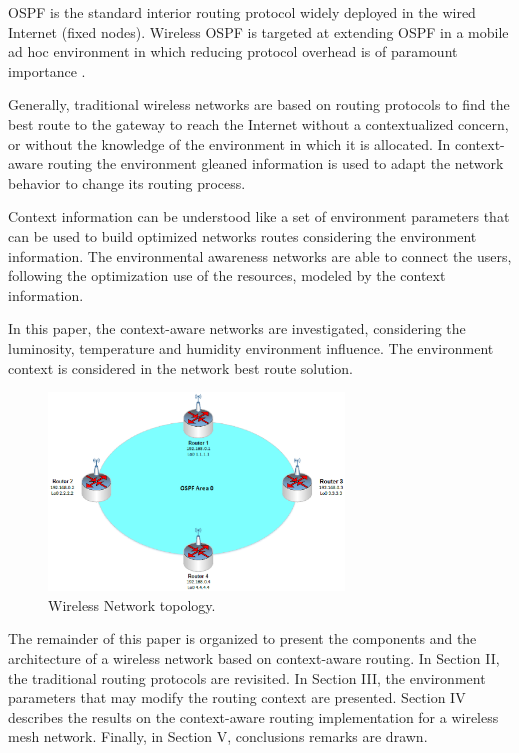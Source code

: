 OSPF is the standard interior routing protocol widely deployed in the wired Internet (fixed nodes). Wireless OSPF is targeted at extending OSPF in a mobile ad hoc environment in which reducing protocol overhead is of paramount importance \cite{Holter2010}.

Generally, traditional wireless networks are based on routing protocols to find the best route to the gateway to reach the Internet without a contextualized concern, or without the knowledge of the environment in which it is allocated. In context-aware routing the environment gleaned information is used to adapt the network behavior to change its routing process.

Context information can be understood like a set of environment parameters that can be used to build optimized networks routes considering the environment information. The environmental awareness networks are able to connect the users, following the optimization use of the resources, modeled by the context information.

In this paper, the context-aware networks are investigated, considering the luminosity, temperature and humidity environment influence. The environment context is considered in the network best route solution.


\begin{figure}[!t]
	\centering
	\includegraphics[width=0.7\textwidth]{figs/topology.eps}
	\caption{Wireless Network topology.}
	\label{Fig01}
\end{figure}

The remainder of this paper is organized to present the components and the architecture of a wireless network based on context-aware routing. In Section II, the traditional routing protocols are revisited. In Section III, the environment parameters that may modify the routing context are presented. Section IV describes the results on the context-aware routing implementation for a wireless mesh network. Finally, in Section V, conclusions remarks are drawn.